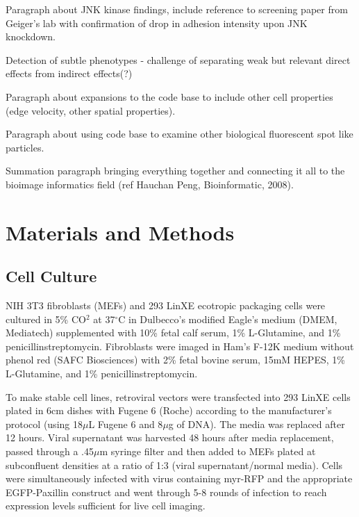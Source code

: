 \documentclass[10pt]{article}
\begin{document}
Paragraph about JNK kinase findings, include reference to screening paper from
Geiger's lab with confirmation of drop in adhesion intensity upon JNK
knockdown.


Detection of subtle phenotypes - challenge of separating weak but relevant
direct effects from indirect effects(?)

Paragraph about expansions to the code base to include other cell properties
(edge velocity, other spatial properties).

Paragraph about using code base to examine other biological fluorescent spot
like particles.

Summation paragraph bringing everything together and connecting it all to the
bioimage informatics field (ref Hauchan Peng, Bioinformatic, 2008). 



\section*{Materials and Methods}

\subsection*{Cell Culture}

NIH 3T3 fibroblasts (MEFs) and 293 LinXE ecotropic packaging cells were cultured
in 5\% CO$^2$ at 37$^\circ$C in Dulbecco's modified Eagle's medium (DMEM, Mediatech)
supplemented with 10\% fetal calf serum, 1\% L-Glutamine, and 1\%
penicillinstreptomycin. Fibroblasts were imaged in Ham's F-12K medium without
phenol red (SAFC Biosciences) with 2\% fetal bovine serum, 15mM HEPES, 1\%
L-Glutamine, and 1\% penicillinstreptomycin. 

To make stable cell lines, retroviral vectors were transfected into 293 LinXE
cells plated in 6cm dishes with Fugene 6 (Roche) according to the manufacturer's
protocol (using 18$\mu$L Fugene 6 and 8$\mu$g of DNA). The media was replaced
after 12 hours. Viral supernatant was harvested 48 hours after media
replacement, passed through a .45$\mu$m syringe filter and then added to MEFs
plated at subconfluent densities at a ratio of 1:3 (viral supernatant/normal
media). Cells were simultaneously infected with virus containing myr-RFP and
the appropriate EGFP-Paxillin construct and went through 5-8 rounds of infection
to reach expression levels sufficient for live cell imaging.
\end{document}
